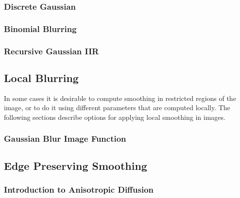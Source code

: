 \subsubsection{Discrete Gaussian}
\label{sec:DiscreteGaussianImageFilter}

\ifitkFullVersion

\fi


\subsubsection{Binomial Blurring}
\label{sec:BinomialBlurImageFilter}

\ifitkFullVersion

\fi

\subsubsection{Recursive Gaussian IIR}
\label{sec:RecursiveGaussianImageFilter}

\ifitkFullVersion

\fi


\subsection{Local Blurring}
\label{sec:BlurringFunctions}

In some cases it is desirable to compute smoothing in restricted regions of the
image, or to do it using different parameters that are computed locally.  The
following sections describe options for applying local smoothing in images.

\subsubsection{Gaussian Blur Image Function}
\label{sec:GaussianBlurImageFunction}

\ifitkFullVersion

\fi

\subsection{Edge Preserving Smoothing}
\label{sec:EdgePreservingSmoothingFilters}

\subsubsection{Introduction to Anisotropic Diffusion}
\label{sec:IntroductionAnisotropicDiffusion}
\ifitkFullVersion

\fi


